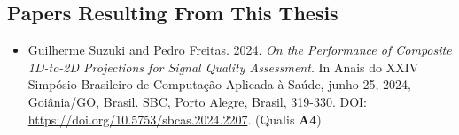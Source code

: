 \documentclass[bacharelado]{UnB-CIC}%
\begin{document}
%

    
    

    \begin{appendices}
        \chapter{Papers Resulting From This Thesis}
        \begin{itemize}
            \item Guilherme Suzuki and Pedro Freitas. 2024. \textit{On the Performance of Composite 1D-to-2D Projections for Signal Quality Assessment}. In Anais do XXIV Simpósio Brasileiro de Computação Aplicada à Saúde, junho 25, 2024, Goiânia/GO, Brasil. SBC, Porto Alegre, Brasil, 319-330. DOI: \url{https://doi.org/10.5753/sbcas.2024.2207}. (Qualis \textbf{A4})
        \end{itemize}
        
        
    \end{appendices}
\end{document}
